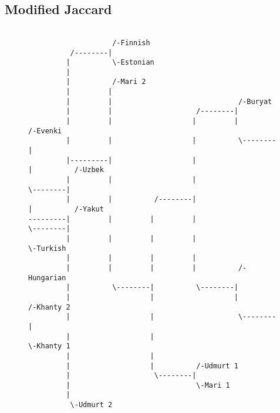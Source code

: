 \subsection{Modified Jaccard}
\begin{figure}[!htb]
\begin{center}
{
\selectfont
\begin{verbatim}

                    /-Finnish
          /--------|
         |          \-Estonian
         |
         |          /-Mari 2
         |         |
         |         |                              /-Buryat
         |         |                    /--------|
         |         |                   |         |          /-Evenki
         |         |                   |          \--------|
         |---------|                   |                   |          /-Uzbek
         |         |                   |                    \--------|
         |         |          /--------|                             |          /-Yakut
---------|         |         |         |                              \--------|
         |         |         |         |                                        \-Turkish
         |         |         |         |
         |         |         |         |          /-Hungarian
         |          \--------|          \--------|
         |                   |                   |          /-Khanty 2
         |                   |                    \--------|
         |                   |                              \-Khanty 1
         |                   |
         |                   |          /-Udmurt 1
         |                    \--------|
         |                              \-Mari 1
         |
          \-Udmurt 2

\end{verbatim}
}
\label{...}
\end{center}
\end{figure}
